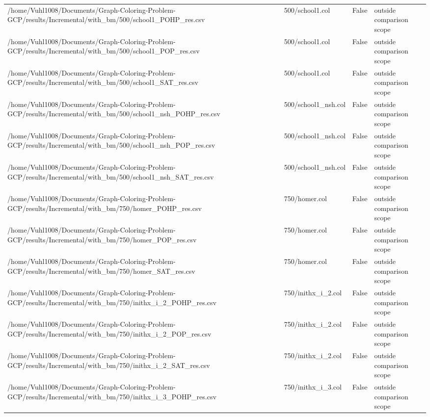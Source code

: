 \begin{table}[htbp]
\begin{tabular}{llll}
/home/Vuhl1008/Documents/Graph-Coloring-Problem-GCP/results/Incremental/with\_bm/500/school1\_POHP\_res.csv & 500/school1.col & False & outside comparison scope \\
/home/Vuhl1008/Documents/Graph-Coloring-Problem-GCP/results/Incremental/with\_bm/500/school1\_POP\_res.csv & 500/school1.col & False & outside comparison scope \\
/home/Vuhl1008/Documents/Graph-Coloring-Problem-GCP/results/Incremental/with\_bm/500/school1\_SAT\_res.csv & 500/school1.col & False & outside comparison scope \\
/home/Vuhl1008/Documents/Graph-Coloring-Problem-GCP/results/Incremental/with\_bm/500/school1\_nsh\_POHP\_res.csv & 500/school1\_nsh.col & False & outside comparison scope \\
/home/Vuhl1008/Documents/Graph-Coloring-Problem-GCP/results/Incremental/with\_bm/500/school1\_nsh\_POP\_res.csv & 500/school1\_nsh.col & False & outside comparison scope \\
/home/Vuhl1008/Documents/Graph-Coloring-Problem-GCP/results/Incremental/with\_bm/500/school1\_nsh\_SAT\_res.csv & 500/school1\_nsh.col & False & outside comparison scope \\
/home/Vuhl1008/Documents/Graph-Coloring-Problem-GCP/results/Incremental/with\_bm/750/homer\_POHP\_res.csv & 750/homer.col & False & outside comparison scope \\
/home/Vuhl1008/Documents/Graph-Coloring-Problem-GCP/results/Incremental/with\_bm/750/homer\_POP\_res.csv & 750/homer.col & False & outside comparison scope \\
/home/Vuhl1008/Documents/Graph-Coloring-Problem-GCP/results/Incremental/with\_bm/750/homer\_SAT\_res.csv & 750/homer.col & False & outside comparison scope \\
/home/Vuhl1008/Documents/Graph-Coloring-Problem-GCP/results/Incremental/with\_bm/750/inithx\_i\_2\_POHP\_res.csv & 750/inithx\_i\_2.col & False & outside comparison scope \\
/home/Vuhl1008/Documents/Graph-Coloring-Problem-GCP/results/Incremental/with\_bm/750/inithx\_i\_2\_POP\_res.csv & 750/inithx\_i\_2.col & False & outside comparison scope \\
/home/Vuhl1008/Documents/Graph-Coloring-Problem-GCP/results/Incremental/with\_bm/750/inithx\_i\_2\_SAT\_res.csv & 750/inithx\_i\_2.col & False & outside comparison scope \\
/home/Vuhl1008/Documents/Graph-Coloring-Problem-GCP/results/Incremental/with\_bm/750/inithx\_i\_3\_POHP\_res.csv & 750/inithx\_i\_3.col & False & outside comparison scope \\

\end{tabular}
\end{table}
